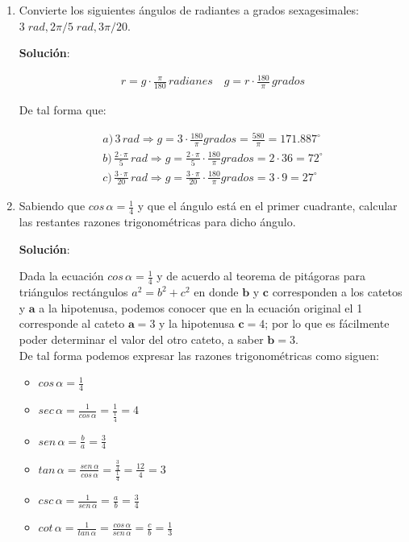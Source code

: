 \documentclass[11pt,letterpaper]{article}
\begin{document}
\begin{enumerate}
	\item Convierte los siguientes ángulos de radiantes a grados sexagesimales: $3\;rad, 2\pi/5\;rad, 3\pi/20$. 

	\textbf{Solución}:
	
	\begin{align*}
		\boxed{ r = g \cdot \frac{\pi}{180}\,radianes} \quad \boxed{ g = r \cdot \frac{180}{\pi}\,grados}
	\end{align*}
	
	De tal forma que:
	
	\begin{align}
		a)\,3\,rad \Rightarrow g = 3 \cdot \frac{180}{\pi} grados = \frac{580}{\pi} = 171.887^{\circ}\\
		b)\,\frac{2 \cdot \pi}{5}\,rad \Rightarrow g = \frac{2 \cdot \pi}{5} \cdot \frac{180}{\pi} grados = 2 \cdot 36 = 72^{\circ}\\
		c)\,\frac{3 \cdot \pi}{20}\,rad \Rightarrow g = \frac{3 \cdot \pi}{20} \cdot \frac{180}{\pi} grados = 3 \cdot 9 = 27^{\circ}
	\end{align}
	
	\item Sabiendo que $cos\,\alpha=\frac{1}{4}$ y que el ángulo está en el primer cuadrante, calcular las restantes razones trigonométricas para dicho ángulo.

	\textbf{Solución}:
	
	Dada la ecuación $cos\,\alpha = \frac{1}{4}$ y de acuerdo al teorema de pitágoras para triángulos rectángulos $a^2 = b^2 + c^2$ en donde $\textbf{b}$ y $\textbf{c}$ 
	corresponden a los catetos y $\textbf{a}$ a la hipotenusa, podemos conocer que en la ecuación original el 1 corresponde al cateto $\textbf{a} = 3$ y la hipotenusa $\textbf{c} = 4$; 
	por lo que es fácilmente poder determinar el valor del otro cateto, a saber $\textbf{b} = 3$. \\
	
	De tal forma podemos expresar las razones trigonométricas como siguen:
	
	\begin{itemize}
		\item $cos\,\alpha = \frac{1}{4}$
		\item $sec\,\alpha = \frac{1}{cos\,\alpha} = \frac{1}{\frac{1}{4}} = 4$
		\item $sen\,\alpha = \frac{b}{a} = \frac{3}{4}$
		\item $tan\,\alpha = \frac{sen\,\alpha}{cos\,\alpha} = \frac{\frac{3}{4}}{\frac{1}{4}} = \frac{12}{4} = 3$
		\item $csc\,\alpha = \frac{1}{sen\,\alpha} = \frac{a}{b} = \frac{3}{4}$
		\item $cot\,\alpha = \frac{1}{tan\,\alpha} = \frac{cos\,\alpha}{sen\,\alpha} = \frac{c}{b} = \frac{1}{3}$
	\end{itemize}


\end{enumerate}
\end{document}
